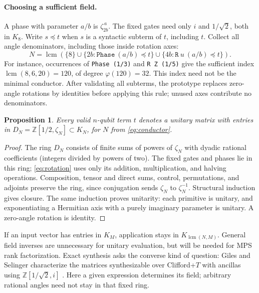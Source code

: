 \documentclass[11pt,a4paper]{article}
\newcommand{\Z}{\mathbb{Z}}
\newcommand{\code}[1]{\texttt{#1}}
\DeclareMathOperator{\lcm}{lcm}
\newtheorem{proposition}{Proposition}
\begin{document}
\paragraph{Choosing a sufficient field.}
A phase with parameter $a/b$ is $\zeta_{2b}^{\,a}$.
The fixed gates need only $i$ and $1/\sqrt2$, both in $K_8$.
Write $s\preceq t$ when $s$ is a syntactic subterm of $t$, including $t$.
Collect all angle denominators, including those inside rotation axes:
\begin{equation}
N=\lcm\!\left(\{8\}\cup\{2b:\code{Phase}\ (a/b)\preceq t\}
                    \cup\{4b:\code{R}\ u\ (a/b)\preceq t\}\right).
\label{eq:conductor}
\end{equation}
For instance, occurrences of \code{Phase (1/3)} and \code{R Z (1/5)}
give the sufficient index $\lcm(8,6,20)=120$, of degree $\varphi(120)=32$.
This index need not be the minimal conductor.
After validating all subterms, the prototype replaces zero-angle rotations
by identities before applying this rule; unused axes contribute no denominators.

\begin{proposition}
Every valid $n$-qubit term $t$ denotes a unitary matrix with entries in
$D_N=\Z[1/2,\zeta_N]\subset K_N$, for $N$ from \eqref{eq:conductor}.
\end{proposition}
\begin{proof}
The ring $D_N$ consists of finite sums of powers of $\zeta_N$ with
dyadic rational coefficients (integers divided by powers of two).
The fixed gates and phases lie in this ring; \eqref{eq:rotation} uses
only its addition, multiplication, and halving operations.
Composition, tensor and direct sums, control, permutations, and adjoints
preserve the ring, since conjugation sends $\zeta_N$ to $\zeta_N^{-1}$.
Structural induction gives closure. The same induction proves unitarity:
each primitive is unitary, and exponentiating a Hermitian axis with a
purely imaginary parameter is unitary. A zero-angle rotation is identity.
\end{proof}
If an input vector has entries in $K_M$, application stays in
$K_{\lcm(N,M)}$. General field inverses are unnecessary for unitary
evaluation, but will be needed for MPS rank factorization.
Exact synthesis asks the converse kind of question: Giles and Selinger
characterize the matrices synthesizable over Clifford+$T$ with ancillas
using $\Z[1/\sqrt2,i]$ \cite{giles}. Here a given expression determines
its field; arbitrary rational angles need not stay in that fixed ring.
\end{document}
